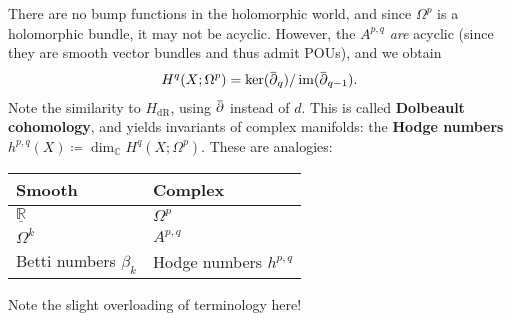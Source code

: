 \begin{remark}

There are no bump functions in the holomorphic world, and since
\(\Omega^p\) is a holomorphic bundle, it may not be acyclic. However,
the \(A^{p, q}\) \emph{are} acyclic (since they are smooth vector
bundles and thus admit POUs), and we obtain
\begin{align*}
H^q(X; \Omega^p) = \ker( \mkern 1.5mu\overline{\mkern-1.5mu{\partial}\mkern-1.5mu}\mkern 1.5mu_q) / \operatorname{im}(\mkern 1.5mu\overline{\mkern-1.5mu{\partial}\mkern-1.5mu}\mkern 1.5mu_{q-1})
.\end{align*}
Note the similarity to \(H_{\mathrm{dR}}\), using
\(\mkern 1.5mu\overline{\mkern-1.5mu{\partial}\mkern-1.5mu}\mkern 1.5mu\)
instead of \(d\). This is called \textbf{Dolbeault cohomology}, and
yields invariants of complex manifolds: the \textbf{Hodge numbers}
\(h^{p, q}(X) \coloneqq\dim_{\mathbb{C}}H^q(X; \Omega^p)\). These are
analogies:

\begin{longtable}[]{@{}ll@{}}
\toprule
Smooth & Complex \\
\midrule
\endhead
\(\underline{{\mathbb{R}}}\) & \(\Omega^p\) \\
\(\Omega^k\) & \(A^{p, q}\) \\
Betti numbers \(\beta_k\) & Hodge numbers \(h^{p, q}\) \\
\bottomrule
\end{longtable}

Note the slight overloading of terminology here!

\end{remark}

